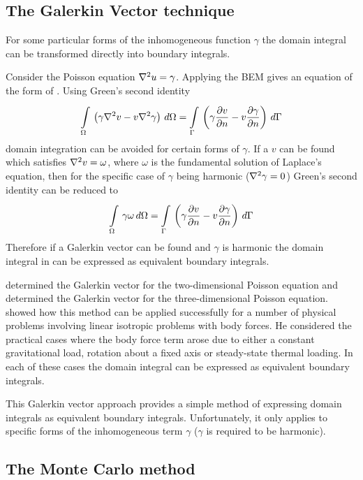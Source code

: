 \subsection{The Galerkin Vector technique}

For some particular forms of the inhomogeneous function $\gamma$ the domain
integral can be transformed directly into boundary integrals. 

Consider the Poisson equation $\nabla^{2} {u} = \gamma$.  Applying the BEM gives
an equation of the form of .  Using Green's second
identity
\begin{equation}
     \displaystyle\int\limits_{\Omega}^{} \,\left( \gamma \nabla^{2} {v} - v
  \nabla^{2} {\gamma} \right)\,d\Omega   = 
     \displaystyle\int\limits_{\Gamma}^{} \,\left( \gamma  \dfrac{\partial v}{\partial n}  - v  \dfrac{\partial \gamma}{\partial n}  \right)\,d\Gamma  
\end{equation}
domain integration can be avoided for certain forms of $\gamma$.  If a
 $v$ can be found which satisfies $\nabla^{2} {v} = \omega$,
where $\omega$ is the fundamental solution of Laplace's equation, then for
the specific case of $\gamma$ being harmonic ($\nabla^{2} {\gamma} = 0$) Green's
second identity can be reduced to
\begin{equation}
     \displaystyle\int\limits_{\Omega}^{} \,\gamma \omega\,d\Omega   =    \displaystyle\int\limits_{\Gamma}^{} \,\left( \gamma  \dfrac{\partial v}{\partial n}  - v
       \dfrac{\partial \gamma}{\partial n}  \right)\,d\Gamma   
\end{equation}
Therefore if a Galerkin vector can be found and $\gamma$ is harmonic the
domain integral in  can be expressed as equivalent
boundary integrals.

 determined the Galerkin vector for the
two-dimensional Poisson equation and  determined
the Galerkin vector for the three-dimensional Poisson equation.
 showed how this method can be applied
successfully for a number of physical problems involving linear isotropic
problems with body forces.  He considered the practical cases where the
body force term arose due to either a constant gravitational load, rotation
about a fixed axis or steady-state thermal loading.  In each of these cases
the domain integral can be expressed as equivalent boundary integrals.

This Galerkin vector approach provides a simple method of expressing 
domain integrals as equivalent boundary integrals.  Unfortunately, it only
applies to specific forms of the inhomogeneous term $\gamma$ (\ie $\gamma$
is required to be harmonic).

\subsection{The Monte Carlo method}

